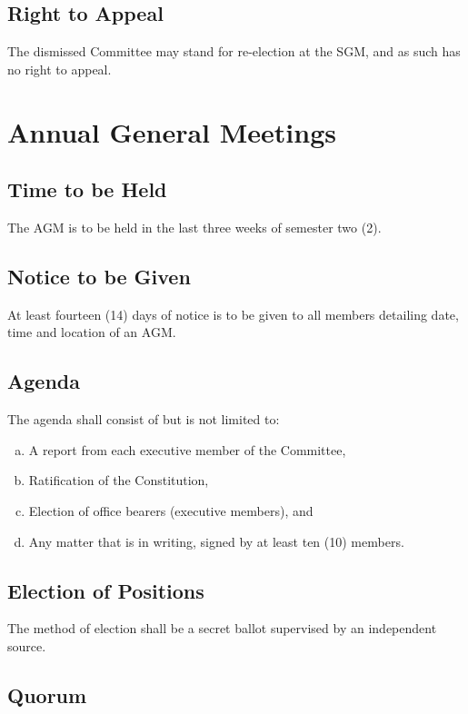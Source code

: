 \documentclass[a4paper,12pt]{article}
\begin{document}
\subsection{Right to Appeal}

The dismissed Committee may stand for re-election at the SGM, and as such has no right to appeal.

\section{Annual General Meetings}

\subsection{Time to be Held}

The AGM is to be held in the last three weeks of semester two (2).

\subsection{Notice to be Given}

At least fourteen (14) days of notice is to be given to all members detailing date, time and location of an AGM.

\subsection{Agenda}

The agenda shall consist of but is not limited to:

\begin{enumerate}[a)]
	\item A report from each executive member of the Committee,
	\item Ratification of the Constitution,
	\item Election of office bearers (executive members), and
	\item Any matter that is in writing, signed by at least ten (10) members.
\end{enumerate}

\subsection{Election of Positions}

The method of election shall be a secret ballot supervised by an independent source.

\subsection{Quorum}
\end{document}
